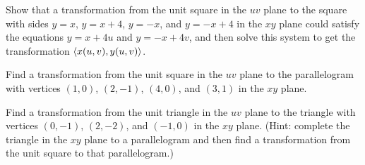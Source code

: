 \documentclass[letterpaper, twoside, 12pt]{book}
\begin{document}
          \begin{problem}
            Show that a transformation from the unit square in the $uv$ plane
            to the square with sides $y=x$, $y=x+4$, $y=-x$,
            and $y=-x+4$ in the $xy$ plane
            could satisfy the equations $y=x+4u$ and $y=-x+4v$, and then
            solve this system to get the transformation
            $\langle x(u,v),y(u,v)\rangle$.
          \end{problem}

          \begin{solution}

          \end{solution}

          \begin{contributors}

          \end{contributors}

          \begin{problem}
            Find a transformation from the unit square in the $uv$ plane
            to the parallelogram with vertices $(1,0)$, $(2,-1)$,
            $(4,0)$, and $(3,1)$ in the $xy$ plane.
          \end{problem}

          \begin{solution}

          \end{solution}

          \begin{contributors}

          \end{contributors}

          \begin{problem}
            Find a transformation from the unit triangle in the $uv$ plane
            to the triangle with vertices $(0,-1)$, $(2,-2)$,
            and $(-1,0)$ in the $xy$ plane. (Hint: complete the triangle
            in the $xy$ plane to a parallelogram and then find a transformation
            from the unit square to that parallelogram.)
          \end{problem}

          \begin{solution}

          \end{solution}

          \begin{contributors}

          \end{contributors}
\end{document}
